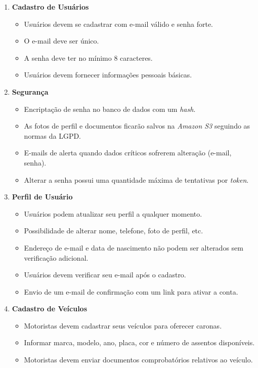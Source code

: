 \begin{enumerate}
	
	\item \textbf{Cadastro de Usuários}
	\begin{itemize}
		\item Usuários devem se cadastrar com e-mail válido e senha forte.
		\item O e-mail deve ser único.
		\item A senha deve ter no mínimo 8 caracteres.
		\item Usuários devem fornecer informações pessoais básicas.
		
	\end{itemize}
	
	\item \textbf{Segurança}
	
	\begin{itemize}
		\item Encriptação de senha no banco de dados com um\textit{ hash}.
		\item As fotos de perfil e documentos ficarão salvos na \textit{Amazon S3} seguindo as normas da LGPD.
		\item E-mails de alerta quando dados críticos sofrerem alteração (e-mail, senha).
		\item Alterar a senha possui uma quantidade máxima de tentativas por \textit{token}.
	\end{itemize}
	
	\item \textbf{Perfil de Usuário}
	
	\begin{itemize}
		\item Usuários podem atualizar seu perfil a qualquer momento.
		\item Possibilidade de alterar nome, telefone, foto de perfil, etc.
		\item Endereço de e-mail e data de nascimento não podem ser alterados sem verificação adicional.
		\item Usuários devem verificar seu e-mail após o cadastro.
		\item Envio de um e-mail de confirmação com um link para ativar a conta.
	\end{itemize}
	
	\item \textbf{Cadastro de Veículos}
	
	\begin{itemize}
		\item Motoristas devem cadastrar seus veículos para oferecer caronas.
		\item Informar marca, modelo, ano, placa, cor e número de assentos disponíveis.
		\item Motoristas devem enviar documentos comprobatórios relativos ao veículo.
	\end{itemize}
	

\end{enumerate}
